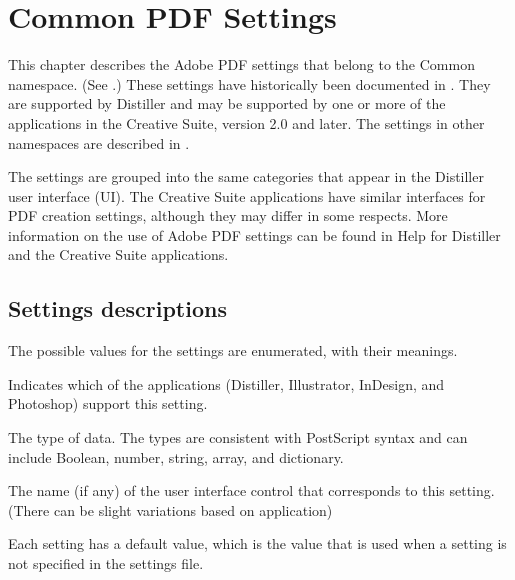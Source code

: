 \documentclass[letterpaper,12pt,english,openany,oneside]{sphinxmanual}
\begin{document}
\chapter{Common PDF Settings}
\label{\detokenize{PDF_Create_CommonSettings:common-pdf-settings}}\label{\detokenize{PDF_Create_CommonSettings::doc}}
This chapter describes the Adobe PDF settings that belong to the Common namespace. (See .) These settings have historically been documented in  . They are supported by Distiller and may be supported by one or more of the applications in the Creative Suite, version 2.0 and later. The settings in other namespaces are described in .

The settings are grouped into the same categories that appear in the Distiller user interface (UI). The Creative Suite applications have similar interfaces for PDF creation settings, although they may differ in some respects. More information on the use of Adobe PDF settings can be found in Help for Distiller and the Creative Suite applications.




\section{Settings descriptions}
\label{\detokenize{PDF_Create_CommonSettings:settings-descriptions}}
The possible values for the settings are enumerated, with their meanings.


Indicates which of the applications (Distiller, Illustrator, InDesign, and Photoshop) support this setting.


The type of data. The types are consistent with PostScript syntax and can include Boolean, number, string, array, and dictionary.


The name (if any) of the user interface control that corresponds to this setting. (There can be slight variations based on application)


Each setting has a default value, which is the value that is used when a setting is not specified in the settings file.
\end{document}
